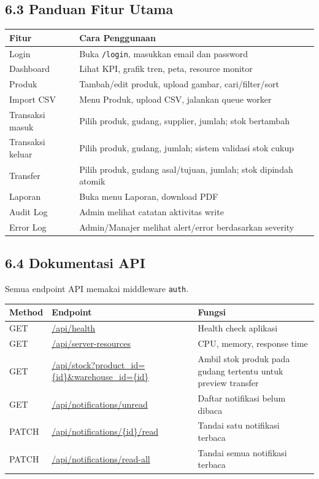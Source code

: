 \documentclass[
]{article}
\begin{document}
\subsection{6.3 Panduan Fitur Utama}\label{63-panduan-fitur-utama}

\begin{longtable}[]{@{}P{0.26\textwidth}P{0.70\textwidth}@{}}
\toprule\noalign{}
Fitur & Cara Penggunaan \\
\midrule\noalign{}
\endhead
\bottomrule\noalign{}
\endlastfoot
Login & Buka \texttt{/login}, masukkan email dan password \\
Dashboard & Lihat KPI, grafik tren, peta, resource monitor \\
Produk & Tambah/edit produk, upload gambar, cari/filter/sort \\
Import CSV & Menu Produk, upload CSV, jalankan queue worker \\
Transaksi masuk & Pilih produk, gudang, supplier, jumlah; stok
bertambah \\
Transaksi keluar & Pilih produk, gudang, jumlah; sistem validasi stok
cukup \\
Transfer & Pilih produk, gudang asal/tujuan, jumlah; stok dipindah
atomik \\
Laporan & Buka menu Laporan, download PDF \\
Audit Log & Admin melihat catatan aktivitas write \\
Error Log & Admin/Manajer melihat alert/error berdasarkan severity \\
\end{longtable}

\subsection{6.4 Dokumentasi API}\label{64-dokumentasi-api}

Semua endpoint API memakai middleware \texttt{auth}.

\begin{longtable}[]{@{}P{0.20\textwidth}P{0.26\textwidth}P{0.50\textwidth}@{}}
\toprule\noalign{}
Method & Endpoint & Fungsi \\
\midrule\noalign{}
\endhead
\bottomrule\noalign{}
\endlastfoot
GET & \url{/api/health} & Health check aplikasi \\
GET & \url{/api/server-resources} & CPU, memory, response time \\
GET & \url{/api/stock?product_id={id}\&warehouse_id={id}} &
Ambil stok produk pada gudang tertentu untuk preview transfer \\
GET & \url{/api/notifications/unread} & Daftar notifikasi belum
dibaca \\
PATCH & \url{/api/notifications/{id}/read} & Tandai satu notifikasi
terbaca \\
PATCH & \url{/api/notifications/read-all} & Tandai semua notifikasi
terbaca \\
\end{longtable}
\end{document}
